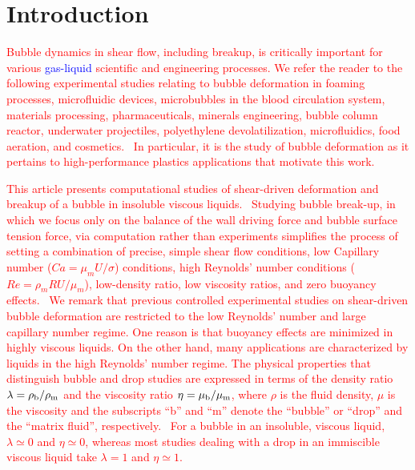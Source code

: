 \documentclass{elsarticle}
\begin{document}
\linenumbers
\section{Introduction}

%
%
\textcolor{red} {
Bubble dynamics in shear flow, including breakup, is critically important for various \textcolor{blue} {gas-liquid} scientific and engineering processes.  We refer the reader to the following experimental studies relating to bubble deformation in foaming processes, microfluidic devices, microbubbles in the blood circulation system, materials processing, pharmaceuticals, minerals engineering, bubble column reactor, underwater projectiles, polyethylene devolatilization, microfluidics, food aeration, and cosmetics\cite{ChuFinBouAtaHamPug19,MulTobDreFisWin08,BenRodFauPinFerPerGarMirLim18,DreSai15,EFTEKHARI2021837,WANG2023108105,doi:10.1021/acs.langmuir.1c01814,yoshikawa2010bubble,CanedoETAL,GAO2022103212,WONG2012417,PolyethyleneDevo,FRENSE2024120579,lohse2018bubble,schluter2021small,SANOGO2023112478}.  In particular, it is the study of bubble deformation as it pertains to high-performance plastics applications that motivate this work.
}
\par
\textcolor{red} {
	This article presents computational studies of shear-driven deformation and breakup of a bubble in insoluble viscous liquids.  Studying bubble break-up, in which we focus only on the balance of the wall driving force and bubble surface tension force, via computation rather than experiments simplifies the process of setting a combination of precise, simple shear flow conditions, low Capillary number ($Ca=\mu_{m}U/\sigma$) conditions, high Reynolds' number conditions ($Re=\rho_{m} R U/\mu_{m}$), low-density ratio, low viscosity ratios, and zero buoyancy effects.  We remark that previous controlled experimental studies on shear-driven bubble deformation are restricted to the low Reynolds' number and large capillary number regime\cite{RusMan02,CanedoETAL}.  One reason is that buoyancy effects are minimized in highly viscous liquids.  On the other hand, many applications are characterized by liquids in the high Reynolds' number regime.  The physical properties that distinguish bubble and drop studies are expressed in terms of the density ratio $\lambda = \rho_{\rm b} / \rho_{\rm m}$ and the viscosity ratio $\eta = \mu_{\rm b} / \mu_{\rm m}$, where $\rho$ is the fluid density, $\mu$ is the viscosity and the subscripts ``b'' and ``m'' denote the ``bubble'' or ``drop'' and the ``matrix fluid'', respectively.  For a bubble in an insoluble, viscous liquid, $\lambda \simeq 0$ and $\eta \simeq 0$, whereas most studies dealing with a drop in an immiscible viscous liquid take $\lambda =1$ and $\eta \simeq 1$.  
}
\end{document}
